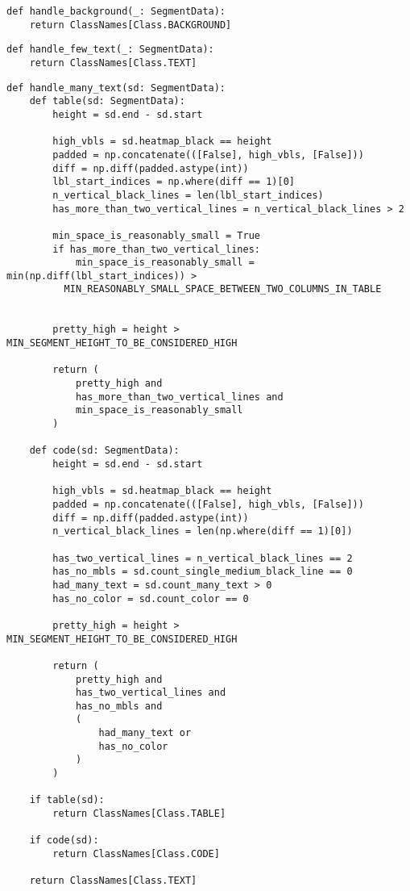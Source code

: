 \begin{lstlisting}[caption={Функция handle\_background}, label={lst:}]
def handle_background(_: SegmentData):
    return ClassNames[Class.BACKGROUND]
\end{lstlisting}

\begin{lstlisting}[caption={Функция handle\_few\_text}, label={lst:}]
def handle_few_text(_: SegmentData):
    return ClassNames[Class.TEXT]
\end{lstlisting}

\begin{lstlisting}[caption={Функция handle\_many\_text}, label={lst:}]
def handle_many_text(sd: SegmentData):
    def table(sd: SegmentData):
        height = sd.end - sd.start

        high_vbls = sd.heatmap_black == height
        padded = np.concatenate(([False], high_vbls, [False]))
        diff = np.diff(padded.astype(int))
        lbl_start_indices = np.where(diff == 1)[0]
        n_vertical_black_lines = len(lbl_start_indices)
        has_more_than_two_vertical_lines = n_vertical_black_lines > 2

        min_space_is_reasonably_small = True
        if has_more_than_two_vertical_lines:
            min_space_is_reasonably_small = min(np.diff(lbl_start_indices)) >
          MIN_REASONABLY_SMALL_SPACE_BETWEEN_TWO_COLUMNS_IN_TABLE


        pretty_high = height > MIN_SEGMENT_HEIGHT_TO_BE_CONSIDERED_HIGH

        return (
            pretty_high and
            has_more_than_two_vertical_lines and
            min_space_is_reasonably_small
        )

    def code(sd: SegmentData):
        height = sd.end - sd.start

        high_vbls = sd.heatmap_black == height
        padded = np.concatenate(([False], high_vbls, [False]))
        diff = np.diff(padded.astype(int))
        n_vertical_black_lines = len(np.where(diff == 1)[0])

        has_two_vertical_lines = n_vertical_black_lines == 2
        has_no_mbls = sd.count_single_medium_black_line == 0
        had_many_text = sd.count_many_text > 0
        has_no_color = sd.count_color == 0

        pretty_high = height > MIN_SEGMENT_HEIGHT_TO_BE_CONSIDERED_HIGH

        return (
            pretty_high and
            has_two_vertical_lines and
            has_no_mbls and
            (
                had_many_text or
                has_no_color
            )
        )

    if table(sd):
        return ClassNames[Class.TABLE]

    if code(sd):
        return ClassNames[Class.CODE]

    return ClassNames[Class.TEXT]
\end{lstlisting}

